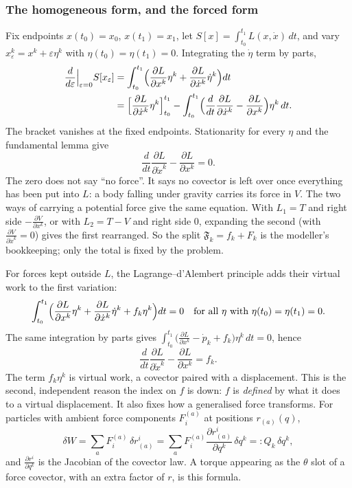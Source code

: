 \subsubsection*{The homogeneous form, and the forced form}
Fix endpoints $x(t_0)=x_0$, $x(t_1)=x_1$, let
$S[x]=\int_{t_0}^{t_1}L(x,\dot x)\,dt$, and vary
$x_\varepsilon^k=x^k+\varepsilon\eta^k$ with $\eta(t_0)=\eta(t_1)=0$.
Integrating the $\dot\eta$ term by parts,
\[
\begin{aligned}
 \frac{d}{d\varepsilon}\Big|_{\varepsilon=0}S[x_\varepsilon]
 &=\int_{t_0}^{t_1}\Bigl(\frac{\partial L}{\partial x^k}\eta^k
   +\frac{\partial L}{\partial\dot x^k}\dot\eta^k\Bigr)dt\\
 &=\Bigl[\frac{\partial L}{\partial\dot x^k}\eta^k\Bigr]_{t_0}^{t_1}
   -\int_{t_0}^{t_1}\Bigl(\frac{d}{dt}\frac{\partial L}{\partial\dot x^k}
   -\frac{\partial L}{\partial x^k}\Bigr)\eta^k\,dt .
\end{aligned}
\]
The bracket vanishes at the fixed endpoints. Stationarity for every $\eta$
and the fundamental lemma give
\begin{equation}\label{Eq:EulerLagrangeHomogeneous}
 \frac{d}{dt}\frac{\partial L}{\partial\dot x^k}
   -\frac{\partial L}{\partial x^k}=0 .
\end{equation}
The zero does not say ``no force''. It says no covector is left over once
everything has been put into $L$: a body falling under gravity carries its
force in $V$. The two ways of carrying a potential force give the same
equation. With $L_1=T$ and right side $-\frac{\partial V}{\partial x^k}$,
or with $L_2=T-V$ and right side $0$, expanding the second
(with $\frac{\partial V}{\partial\dot x^k}=0$) gives the first rearranged. So
the split $\mathfrak F_k=f_k+F_k$ is the modeller's bookkeeping; only the
total is fixed by the problem.

For forces kept outside $L$, the Lagrange--d'Alembert principle adds their
virtual work to the first variation:
\[
 \int_{t_0}^{t_1}\Bigl(\frac{\partial L}{\partial x^k}\eta^k
  +\frac{\partial L}{\partial\dot x^k}\dot\eta^k
  +f_k\eta^k\Bigr)dt=0
 \quad\text{for all }\eta\text{ with }\eta(t_0)=\eta(t_1)=0 .
\]
The same integration by parts gives
$\int_{t_0}^{t_1}\bigl(\frac{\partial L}{\partial x^k}-\dot p_k+f_k\bigr)
\eta^k\,dt=0$, hence
\begin{equation}\label{Eq:EulerLagrangeForced}
 \frac{d}{dt}\frac{\partial L}{\partial\dot x^k}
 -\frac{\partial L}{\partial x^k}=f_k .
\end{equation}
The term $f_k\eta^k$ is virtual work, a covector paired with a displacement.
This is the second, independent reason the index on $f$ is down: $f$ is
\emph{defined} by what it does to a virtual displacement. It also fixes how
a generalised force transforms. For particles with ambient force components
$F^{(a)}_i$ at positions $r_{(a)}(q)$,
\[
 \delta W=\sum_a F^{(a)}_i\,\delta r^i_{(a)}
  =\sum_a F^{(a)}_i\frac{\partial r^i_{(a)}}{\partial q^k}\,\delta q^k
  =:Q_k\,\delta q^k ,
\]
and $\frac{\partial r^i}{\partial q^k}$ is the Jacobian of the covector law.
A torque appearing as the $\theta$ slot of a force covector, with an extra
factor of $r$, is this formula.

